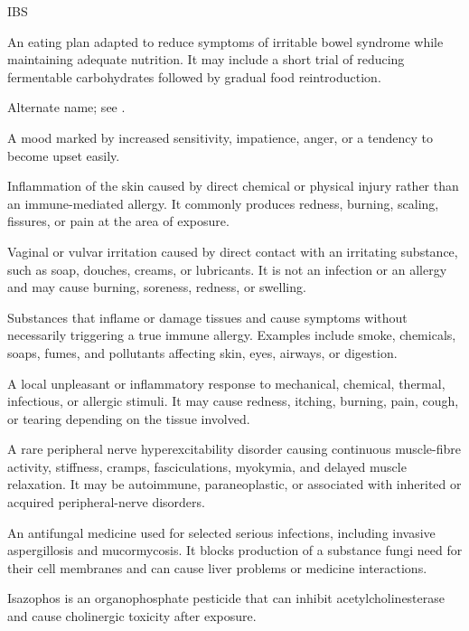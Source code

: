 \synonyms
IBS

 An eating plan adapted to reduce symptoms of irritable bowel syndrome while maintaining adequate nutrition. It may include a short trial of reducing fermentable carbohydrates followed by gradual food reintroduction.

 Alternate name; see .

 A mood marked by increased sensitivity, impatience, anger, or a tendency to become upset easily.

 Inflammation of the skin caused by direct chemical or physical injury rather than an immune-mediated allergy. It commonly produces redness, burning, scaling, fissures, or pain at the area of exposure.

 Vaginal or vulvar irritation caused by direct contact with an irritating substance, such as soap, douches, creams, or lubricants. It is not an infection or an allergy and may cause burning, soreness, redness, or swelling.

 Substances that inflame or damage tissues and cause symptoms without necessarily triggering a true immune allergy. Examples include smoke, chemicals, soaps, fumes, and pollutants affecting skin, eyes, airways, or digestion.

 A local unpleasant or inflammatory response to mechanical, chemical, thermal, infectious, or allergic stimuli. It may cause redness, itching, burning, pain, cough, or tearing depending on the tissue involved.

 A rare peripheral nerve hyperexcitability disorder causing continuous muscle-fibre
activity, stiffness, cramps, fasciculations, myokymia, and delayed muscle relaxation. It
may be autoimmune, paraneoplastic, or associated with inherited or acquired
peripheral-nerve disorders.

 An antifungal medicine used for selected serious infections, including invasive aspergillosis and mucormycosis. It blocks production of a substance fungi need for their cell membranes and can cause liver problems or medicine interactions.

 Isazophos is an organophosphate pesticide that can inhibit acetylcholinesterase and cause cholinergic toxicity after exposure.

